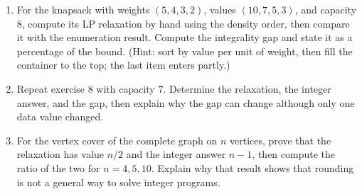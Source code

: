 \begin{latihan}
\begin{enumerate}
  \item For the knapsack with weights $(5,4,3,2)$, values $(10,7,5,3)$, and capacity
        $8$, compute its LP relaxation by hand using the density order, then compare it with the
        enumeration result. Compute the integrality gap and state it as a percentage of the
        bound. (Hint: sort by value per unit of weight, then fill the container to the top; the
        last item enters partly.)

  \item Repeat exercise 8 with capacity $7$. Determine the relaxation, the integer answer, and
        the gap, then explain why the gap can change although only one data value changed.

  \item For the vertex cover of the complete graph on $n$ vertices, prove that the relaxation has
        value $n/2$ and the integer answer $n-1$, then compute the ratio of the two for
        $n=4,5,10$. Explain why that result shows that rounding is not a general way to solve
        integer programs.
\end{enumerate}
\end{latihan}

